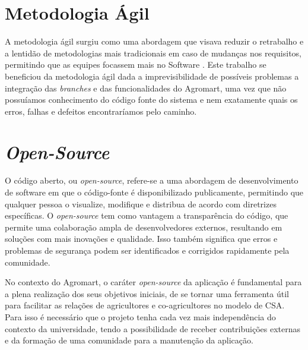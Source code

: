 \section{Metodologia Ágil}
A metodologia ágil surgiu como uma abordagem que visava reduzir o retrabalho e a lentidão de metodologias mais tradicionais em caso de mudanças nos requisitos, permitindo que as equipes focassem mais no Software \cite{Sommerville2007}.
Este trabalho se beneficiou da metodologia ágil dada a imprevisibilidade de possíveis problemas a integração das \textit{branches} e das funcionalidades do Agromart, uma vez que não possuíamos conhecimento do código fonte do sistema e nem exatamente quais os erros, falhas e defeitos encontraríamos pelo caminho.

\section{\textit{Open-Source}}
O código aberto, ou \textit{open-source}, refere-se a uma abordagem de desenvolvimento de software em que o código-fonte é disponibilizado publicamente, permitindo que qualquer pessoa o visualize, modifique e distribua de acordo com diretrizes específicas.\cite{opensource2023} O \textit{open-source} tem como vantagem a transparência do código, que permite uma colaboração ampla de desenvolvedores externos, resultando em soluções com mais inovações e qualidade. Isso também significa que erros e problemas de segurança podem ser identificados e corrigidos rapidamente pela comunidade. 

No contexto do Agromart, o caráter \textit{open-source} da aplicação é fundamental para a plena realização dos seus objetivos iniciais, de se tornar uma ferramenta útil para facilitar as relações de agricultores e co-agricultores no modelo de CSA. Para isso é necessário que o projeto tenha cada vez mais independência do contexto da universidade, tendo a possibilidade de receber contribuições externas e da formação de uma comunidade para a manutenção da aplicação.








